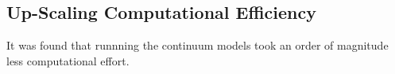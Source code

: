 \subsection{Up-Scaling Computational Efficiency}

It was found that runnning the continuum models took an order of magnitude less computational effort. 